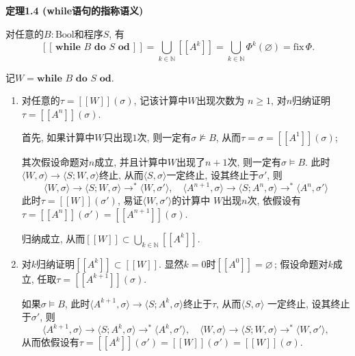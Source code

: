 \documentclass[UTF8]{ctexart}
\begin{document}
\hypertarget{sec:定理1.4}{}
\noindent\textbf{定理1.4 (while语句的指称语义)}

对任意的$B:\mathrm{Bool}$和程序$S$, 有
\[
    [\![\,\mathbf{while}\,\,B\,\,\mathbf{do}\,\,S\,\,\mathbf{od}\,]\!]=
    \bigcup_{k\in\mathbb{N}}[\![A^k]\!]=
    \bigcup_{k\in\mathbb{N}}\Phi^k(\varnothing)=\mathrm{fix}\,\Phi.
\]


记$W=\mathbf{while}\,\,B\,\,\mathbf{do}\,\,S\,\,\mathbf{od}$.

\begin{enumerate}
    \item 对任意的$\tau=[\![W]\!](\sigma)$, 记该计算中$W$出现次数为
    $n\geqslant 1$, 对$n$归纳证明$\tau=[\![A^n]\!](\sigma)$.

    \hspace{2.17em}
    首先, 如果计算中$W$只出现$1$次, 则一定有$\sigma\not\models B$,
    从而$\tau=\sigma=[\![A^1]\!](\sigma)$;

    \hspace{2.17em}
    其次假设命题对$n$成立, 并且计算中$W$出现了$n+1$次, 则一定有$\sigma\models B$.
    此时$\langle W,\sigma\rangle\to\langle S;W,\sigma\rangle$终止,
    从而$\langle S,\sigma\rangle$一定终止, 设其终止于$\sigma'$, 则
    \[
        \langle W,\sigma\rangle\to\langle S;W,\sigma\rangle\to^*
        \langle W,\sigma'\rangle,\quad
        \langle A^{n+1},\sigma\rangle\to\langle S;A^n,\sigma\rangle\to^*
        \langle A^n,\sigma'\rangle
    \]
    此时$\tau=[\![W]\!](\sigma')$, 易证$\langle W,\sigma'\rangle$的计算中
    $W$出现$n$次, 依假设有$\tau=[\![A^n]\!](\sigma')=[\![A^{n+1}]\!](\sigma)$.

    \vspace{3pt}\hspace{2.17em}
    归纳成立, 从而$\displaystyle[\![W]\!]\subset
    \bigcup_{k\in\mathbb{N}}[\![A^k]\!]$.

    \vspace{5pt}
    \item 对$k$归纳证明$[\![A^k]\!]\subset[\![W]\!]$.
    显然$k=0$时$[\![A^0]\!]=\varnothing$\,; 假设命题对$k$成立,
    任取$\tau=[\![A^{k+1}]\!](\sigma)$.

    \hspace{2.17em}
    如果$\sigma\models B$, 此时$\langle A^{k+1},\sigma\rangle\to
    \langle S;A^k,\sigma\rangle$终止于$\tau$, 从而$\langle S,\sigma\rangle$
    一定终止, 设其终止于$\sigma'$, 则
    \[
        \langle A^{k+1},\sigma\rangle\to\langle S;A^k,\sigma\rangle\to^*
        \langle A^k,\sigma'\rangle,\quad
        \langle W,\sigma\rangle\to\langle S;W,\sigma\rangle\to^*
        \langle W,\sigma'\rangle,
    \]
    从而依假设有$\tau=[\![A^k]\!](\sigma')=[\![W]\!](\sigma')=[\![W]\!](\sigma)$.


\end{enumerate}
\end{document}
